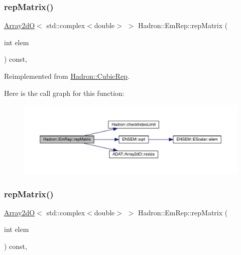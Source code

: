 \subsubsection{\texorpdfstring{repMatrix()}{repMatrix()}\hspace{0.1cm}{\footnotesize\ttfamily [1/3]}}
{\footnotesize\ttfamily \mbox{\hyperlink{classADAT_1_1Array2dO}{Array2dO}}$<$ std\+::complex$<$double$>$ $>$ Hadron\+::\+Em\+Rep\+::rep\+Matrix (\begin{DoxyParamCaption}\item[{int}]{elem }\end{DoxyParamCaption}) const\hspace{0.3cm}{\ttfamily [inline]}, {\ttfamily [virtual]}}



Reimplemented from \mbox{\hyperlink{structHadron_1_1CubicRep_ac5d7e9e6f4ab1158b5fce3e4ad9e8005}{Hadron\+::\+Cubic\+Rep}}.

Here is the call graph for this function\+:
\nopagebreak
\begin{figure}[H]
\begin{center}
\leavevmode
\includegraphics[width=350pt]{d6/d4b/structHadron_1_1EmRep_a8c91198aaf2473fd63a22c16ed7415f2_cgraph}
\end{center}
\end{figure}
\mbox{\label{structHadron_1_1EmRep_a8c91198aaf2473fd63a22c16ed7415f2}} 
\subsubsection{\texorpdfstring{repMatrix()}{repMatrix()}\hspace{0.1cm}{\footnotesize\ttfamily [2/3]}}
{\footnotesize\ttfamily \mbox{\hyperlink{classADAT_1_1Array2dO}{Array2dO}}$<$ std\+::complex$<$double$>$ $>$ Hadron\+::\+Em\+Rep\+::rep\+Matrix (\begin{DoxyParamCaption}\item[{int}]{elem }\end{DoxyParamCaption}) const\hspace{0.3cm}{\ttfamily [inline]}, {\ttfamily [virtual]}}



